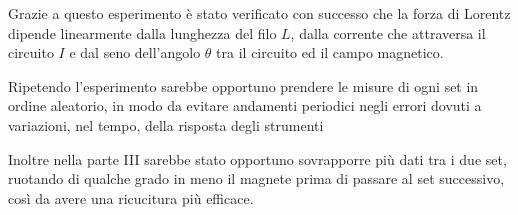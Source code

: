 {\fontsize{12}{14}\selectfont 

Grazie a questo esperimento è stato verificato con successo che la forza di Lorentz dipende linearmente dalla lunghezza del filo $L$, dalla corrente che attraversa il circuito $I$ e dal seno dell'angolo $\theta$ tra il circuito ed il campo magnetico.
\par
Ripetendo l'esperimento sarebbe opportuno prendere le misure di ogni set in ordine aleatorio, in modo da evitare andamenti periodici negli errori dovuti a variazioni, nel tempo, della risposta degli strumenti
\par
Inoltre nella parte III sarebbe stato opportuno sovrapporre più dati tra i due set, ruotando di qualche grado in meno il magnete prima di passare al set successivo, così da avere una ricucitura più efficace.

\par}